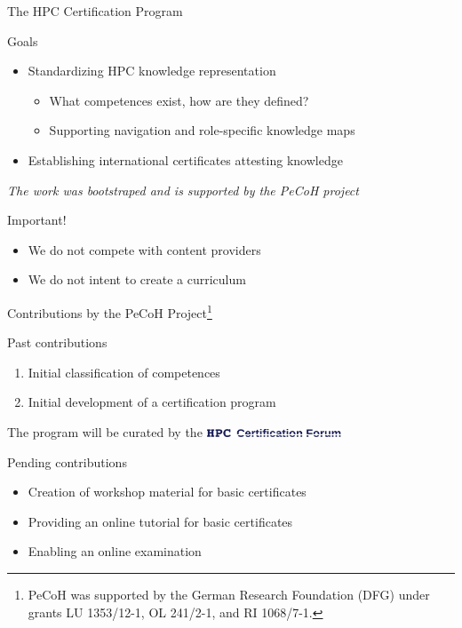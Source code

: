 \documentclass[compress,aspectratio=169]{beamer}
\begin{document}
\begin{frame}{The HPC Certification Program}
		\begin{block}{Goals}
			\begin{itemize}
				\item Standardizing HPC knowledge representation
          \begin{itemize}
						\item What competences exist, how are they defined?
            \item Supporting navigation and role-specific knowledge maps
          \end{itemize}
				\item Establishing international certificates attesting knowledge
			\end{itemize}
		\end{block}

		\textit{The work was bootstraped and is supported by the PeCoH project}
		\begin{block}{Important!}
			\begin{itemize}
				\item We do not compete with content providers
				\item We do not intent to create a curriculum
			\end{itemize}
		\end{block}



\end{frame}


\begin{frame}{Contributions by the PeCoH Project\footnote[frame]{PeCoH was supported by the German Research Foundation (DFG) under grants LU 1353/12-1, OL 241/2-1, and RI 1068/7-1.}}
	\begin{block}{Past contributions}
		\vspace*{-2mm}
		\begin{enumerate}
			\item Initial classification of competences
			\item Initial development of a certification program
		\end{enumerate}
	\end{block}

  The program will be curated by the \includegraphics[width=0.3\textwidth]{hpccf-full}

  \begin{block}{Pending contributions}
    \begin{itemize}
			\item Creation of workshop material for basic certificates
			\item Providing an online tutorial  for basic certificates
			\item Enabling an online examination
    \end{itemize}
  \end{block}
\end{frame}
\end{document}
